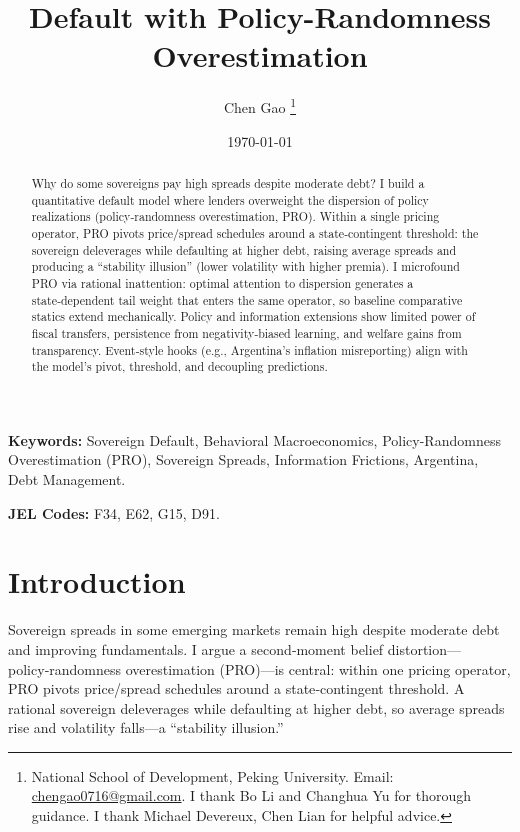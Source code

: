 \documentclass[12pt]{article}
\title{Default with Policy-Randomness Overestimation}
\author{Chen Gao \thanks{National School of Development, Peking University. Email: \url{chengao0716@gmail.com}. I thank Bo Li and Changhua Yu for thorough guidance. I thank Michael Devereux, Chen Lian for helpful advice.}}
\date{ \today}
\theoremstyle{plain}
\begin{document}
\maketitle

\begin{abstract}
	Why do some sovereigns pay high spreads despite moderate debt? I build a quantitative default model where lenders overweight the dispersion of policy realizations (policy‑randomness overestimation, PRO). Within a single pricing operator, PRO pivots price/spread schedules around a state‑contingent threshold: the sovereign deleverages while defaulting at higher debt, raising average spreads and producing a “stability illusion” (lower volatility with higher premia). I microfound PRO via rational inattention: optimal attention to dispersion generates a state‑dependent tail weight that enters the same operator, so baseline comparative statics extend mechanically. Policy and information extensions show limited power of fiscal transfers, persistence from negativity‑biased learning, and welfare gains from transparency. Event‑style hooks (e.g., Argentina’s inflation misreporting) align with the model’s pivot, threshold, and decoupling predictions.
\end{abstract}

\noindent \textbf{Keywords:} Sovereign Default, Behavioral Macroeconomics, Policy-Randomness Overestimation (PRO), Sovereign Spreads, Information Frictions, Argentina, Debt Management.

\noindent \textbf{JEL Codes:} F34, E62, G15, D91.

\clearpage

\section{Introduction}
\label{sec:intro}

Sovereign spreads in some emerging markets remain high despite moderate debt
and improving fundamentals. I argue a second‑moment belief
distortion—policy‑randomness overestimation (PRO)—is central: within one
pricing operator, PRO pivots price/spread schedules around a state‑contingent
threshold. A rational sovereign deleverages while defaulting at higher debt, so
average spreads rise and volatility falls—a “stability illusion.”
\end{document}
